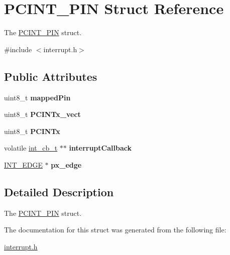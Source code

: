 \hypertarget{structPCINT__PIN}{}\section{P\+C\+I\+N\+T\+\_\+\+P\+IN Struct Reference}
\label{structPCINT__PIN}


The \hyperlink{structPCINT__PIN}{P\+C\+I\+N\+T\+\_\+\+P\+IN} struct.  




{\ttfamily \#include $<$interrupt.\+h$>$}

\subsection*{Public Attributes}
\begin{DoxyCompactItemize}
\item 
\mbox{\label{structPCINT__PIN_a2496d6cb8626cb2f59cbce2275c955f7}} 
uint8\+\_\+t {\bfseries mapped\+Pin}
\item 
\mbox{\label{structPCINT__PIN_afc86dc0ea0cd5858b9bd39354192ef0e}} 
uint8\+\_\+t {\bfseries P\+C\+I\+N\+Tx\+\_\+vect}
\item 
\mbox{\label{structPCINT__PIN_a365ae7574c175d0e95b17e72f6d10d14}} 
uint8\+\_\+t {\bfseries P\+C\+I\+N\+Tx}
\item 
\mbox{\label{structPCINT__PIN_a86cd558d3cb07e08e09aa5b4fc764a6b}} 
volatile \hyperlink{interrupt_8h_af3e04027ddcd2e23670a55888d788d13}{int\+\_\+cb\+\_\+t} $\ast$$\ast$ {\bfseries interrupt\+Callback}
\item 
\mbox{\label{structPCINT__PIN_ac80a352adca1ee695bd338be6e3828e3}} 
\hyperlink{interrupt_8h_affe9baf0034f4cbb8aec6ed2c42b1676}{I\+N\+T\+\_\+\+E\+D\+GE} $\ast$ {\bfseries px\+\_\+edge}
\end{DoxyCompactItemize}


\subsection{Detailed Description}
The \hyperlink{structPCINT__PIN}{P\+C\+I\+N\+T\+\_\+\+P\+IN} struct. 

The documentation for this struct was generated from the following file\+:\begin{DoxyCompactItemize}
\item 
\hyperlink{interrupt_8h}{interrupt.\+h}\end{DoxyCompactItemize}
